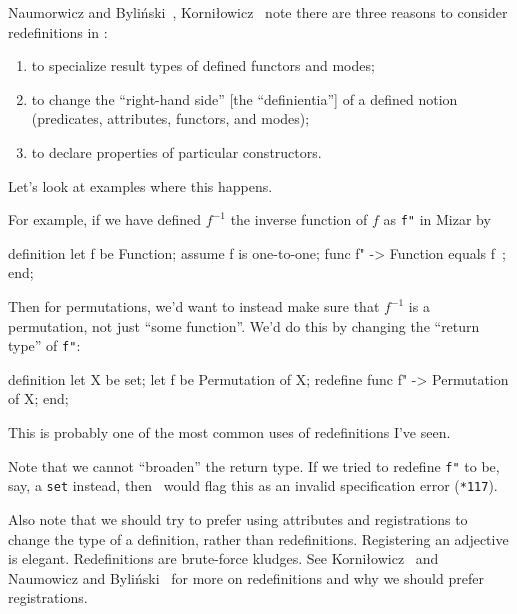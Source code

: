 \begin{node}[Redefinitions]\label{mizar-001O}%
Naumorwicz and Byli{\'n}ski~\cite{naumowicz2004improving}, Korni\l{}owicz~\cite{Korniowicz2016registrations} note there are three
reasons to consider redefinitions in \Mizar:
\begin{enumerate}
\item to specialize result types of defined functors and modes;
\item to change the ``right-hand side'' [the ``definientia''] of a
  defined notion (predicates, attributes, functors, and modes);
\item to declare properties of particular constructors.
\end{enumerate}
Let's look at examples where this happens.
\begin{node}\label{mizar-001P}%
For example, if we have defined $f^{-1}$ the inverse function of $f$ as
\verb|f"| in Mizar by
\begin{mizar}
definition
  let f be Function;
  assume f is one-to-one;
  func f" -> Function equals
  f~;
end;
\end{mizar}
Then for permutations, we'd want to instead make sure that $f^{-1}$ is a
permutation, not just ``some function''. We'd do this by changing the
``return type'' of \verb|f"|:
\begin{mizar}
definition
  let X be set;
  let f be Permutation of X;
  redefine func f" -> Permutation of X;
end;
\end{mizar}
This is probably one of the most common uses of redefinitions I've seen.

\begin{node}\label{mizar-001S}%
Note that we cannot ``broaden'' the return type. If we tried to redefine
\verb|f"| to be, say, a \texttt{set} instead, then \Mizar\ would flag
this as an invalid specification error (\texttt{*117}).
\end{node}
\begin{node}\label{mizar-001T}%
Also note that we should try to prefer using attributes and
registrations to change the type of a definition, rather than
redefinitions. Registering an adjective is elegant. Redefinitions are
brute-force kludges. See Korni\l{}owicz~\cite{Korniowicz2016registrations}
and Naumowicz and Byli{\'n}ski~\cite{naumowicz2004improving} for more on
redefinitions and why we should prefer registrations.
\end{node}
\end{node}


\end{node}
